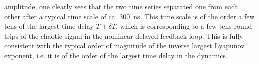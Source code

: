 amplitude, one clearly sees that the two time series separated one from
each other after a typical time scale of ca. 300~ns. This time scale
is of the order a few tens of the largest time delay $T+\delta T$,
which is corresponding to a few tens round trips of the chaotic signal
in the nonlinear delayed feedback loop. This is fully consistent with
the typical order of magnitude of the inverse largest Lyapunov
exponent, i.e. it is of the order of the largest time delay in the
dynamics.
%



